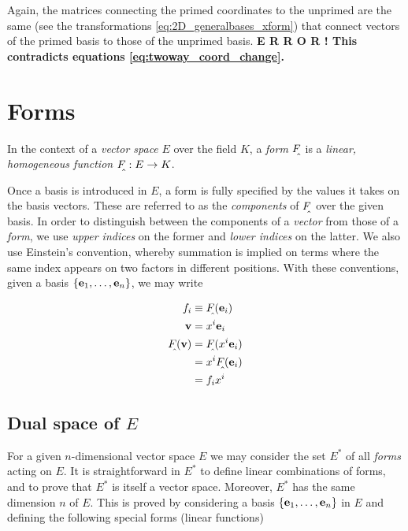 Again, the matrices connecting the primed coordinates to the unprimed are the same (see the transformations  \ref{eq:2D_generalbases_xform}) that connect vectors of the primed basis to those of the unprimed basis.
\textbf{E R R O R !  This contradicts equations \ref{eq:twoway_coord_change}.} 


\section{Forms}
In the context of a \textit{vector space} $E$ over the field $K$, a \textit{form} $\form{F}$ is a \textit{linear, homogeneous function} $\form{F} :E \rightarrow K$. 

Once a basis is introduced in $E$, a form is fully specified by the values it takes on the basis vectors. These are referred to as the \textit{components} of $\form{F}$ over the given basis. In order to distinguish between the components of a \textit{vector} from those of a \textit{form}, we use \textit{upper indices} on the former and \textit{lower indices} on the latter. We also use Einstein's convention, whereby summation is implied on terms where the same index appears on two factors in different positions. With these conventions, given a basis $\{\vb{e}_1, \ldots, \vb{e}_n\}$, we may write

\begin{subequations}
\label{eq:form_components}
\begin{align}   
f_i    &\equiv \form{F} (\vb{e}_i) \\
\vb{v} &= x^i \vb{e}_i \\
\form{F}(\vb{v}) &= \form{F}(x^i \vb{e}_i) \\
                 &= x^i  \form{F}(\vb{e}_i) \\
                 &= f_i x^i
\end{align}
\end{subequations}

\subsection{Dual space of $E$}
For a given $n$-dimensional vector space $E$ we may consider the set $E^*$ of all \textit{forms} acting on $E$. It is straightforward in $E^*$ to define linear combinations of forms, and to prove that $E^*$ is itself a vector space. Moreover, $E^*$ has the same dimension $n$ of $E$. This is proved by considering a basis $\{\vb{e}_1, \ldots, \vb{e}_n\}$ in $E$ and defining the following special forms (linear functions)

